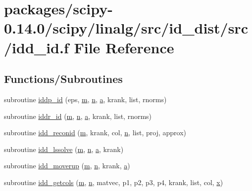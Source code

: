 \hypertarget{idd__id_8f}{}\section{packages/scipy-\/0.14.0/scipy/linalg/src/id\+\_\+dist/src/idd\+\_\+id.f File Reference}
\label{idd__id_8f}
\subsection*{Functions/\+Subroutines}
\begin{DoxyCompactItemize}
\item 
subroutine \hyperlink{idd__id_8f_a9fe8fb27ed9ef2839b7aa89fb15accdd}{iddp\+\_\+id} (eps, \hyperlink{indexexpr_8h_ab72fdb4031d47b75ab26dd18a437bcdc}{m}, \hyperlink{indexexpr_8h_ab427e2e2b4d6cec55fa088ea2a692ace}{n}, \hyperlink{gen__mat5files_8m_aae328bf20413f220e38aec4d95bfd6da}{a}, krank, list, rnorms)
\item 
subroutine \hyperlink{idd__id_8f_ada10d007e014198d095cd04e08851b40}{iddr\+\_\+id} (\hyperlink{indexexpr_8h_ab72fdb4031d47b75ab26dd18a437bcdc}{m}, \hyperlink{indexexpr_8h_ab427e2e2b4d6cec55fa088ea2a692ace}{n}, \hyperlink{gen__mat5files_8m_aae328bf20413f220e38aec4d95bfd6da}{a}, krank, list, rnorms)
\item 
subroutine \hyperlink{idd__id_8f_afbe80732dbd7d373af44e28cc9918389}{idd\+\_\+reconid} (\hyperlink{indexexpr_8h_ab72fdb4031d47b75ab26dd18a437bcdc}{m}, krank, col, \hyperlink{indexexpr_8h_ab427e2e2b4d6cec55fa088ea2a692ace}{n}, list, proj, approx)
\item 
subroutine \hyperlink{idd__id_8f_a53fc0048b2bf5d164836f941083e4da6}{idd\+\_\+lssolve} (\hyperlink{indexexpr_8h_ab72fdb4031d47b75ab26dd18a437bcdc}{m}, \hyperlink{indexexpr_8h_ab427e2e2b4d6cec55fa088ea2a692ace}{n}, \hyperlink{gen__mat5files_8m_aae328bf20413f220e38aec4d95bfd6da}{a}, krank)
\item 
subroutine \hyperlink{idd__id_8f_af7e396bbc128aa2dd384797ee2799afe}{idd\+\_\+moverup} (\hyperlink{indexexpr_8h_ab72fdb4031d47b75ab26dd18a437bcdc}{m}, \hyperlink{indexexpr_8h_ab427e2e2b4d6cec55fa088ea2a692ace}{n}, krank, \hyperlink{gen__mat5files_8m_aae328bf20413f220e38aec4d95bfd6da}{a})
\item 
subroutine \hyperlink{idd__id_8f_aec0ca30257658318f05a38f1332e1374}{idd\+\_\+getcols} (\hyperlink{indexexpr_8h_ab72fdb4031d47b75ab26dd18a437bcdc}{m}, \hyperlink{indexexpr_8h_ab427e2e2b4d6cec55fa088ea2a692ace}{n}, matvec, p1, p2, p3, p4, krank, list, col, \hyperlink{vecnorm1_8cc_ac73eed9e41ec09d58f112f06c2d6cb63}{x})

\end{DoxyCompactItemize}
